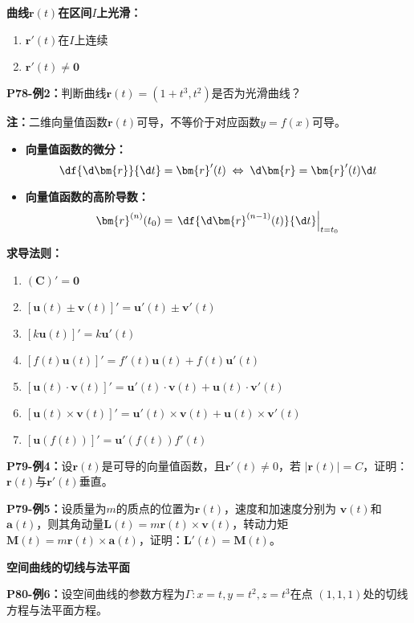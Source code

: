 {\bf 曲线$\bm{r}(t)$在区间$I$上光滑：}
\begin{enumerate}[(1)]
  \setlength{\itemindent}{1cm}
  \item $\bm{r}'(t)$在$I$上连续
  \item $\bm{r}'(t)\ne \bm{0}$
\end{enumerate}

{\bf P78-例2：}判断曲线$\bm{r}(t)=(1+t^3,t^2)$是否为光滑曲线？

{\bf 注：}二维向量值函数$\bm{r}(t)$可导，不等价于对应函数$y=f(x)$可导。

\begin{itemize}
  \setlength{\itemindent}{1cm}
  \item {\bf 向量值函数的微分：}
  $$\df{\d\bm{r}}{\d t}=\bm{r}'(t)\;\Leftrightarrow\;
  \d\bm{r}=\bm{r}'(t)\d t$$
  \item {\bf 向量值函数的高阶导数：}
  $$\bm{r}^{(n)}(t_0)=\left.\df{\d\bm{r}^{(n-1)}(t)}{\d t}\right|_{t=t_0}$$
\end{itemize}

{\bf 求导法则：}

\begin{enumerate} 
  \item $(\bm{C})'=\bm{0}$ 
  \item $[\bm{u}(t)\pm\bm{v}(t)]'=\bm{u}'(t)\pm\bm{v}'(t)$ 
  \item $[k\bm{u}(t)]'=k\bm{u}'(t)$ 
  \item $[f(t)\bm{u}(t)]'=f'(t)\bm{u}(t)+f(t)\bm{u}'(t)$ 
  \item {$[\bm{u}(t)\cdot\bm{v}(t)]'=\bm{u}'(t)\cdot\bm{v}(t)
  +\bm{u}(t)\cdot\bm{v}'(t)$} 
  \item {$[\bm{u}(t)\times\bm{v}(t)]'=\bm{u}'(t)\times\bm{v}(t)
  +\bm{u}(t)\times\bm{v}'(t)$} 
  \item $[\bm{u}(f(t))]'=\bm{u}'(f(t))f'(t)$ 
\end{enumerate}

{\bf P79-例4：}设$\bm{r}(t)$是可导的向量值函数，且$\bm{r}'(t)\ne 0$，若
$|\bm{r}(t)|=C$，证明：$\bm{r}(t)$与$\bm{r}'(t)$垂直。

{\bf P79-例5：}设质量为$m$的质点的位置为$\bm{r}(t)$，速度和加速度分别为
$\bm{v}(t)$和$\bm{a}(t)$，则其角动量$\bm{L}(t)
=m\bm{r}(t)\times\bm{v}(t)$，转动力矩$\bm{M}(t)=m\bm{r}(t)
\times\bm{a}(t)$，证明：$\bm{L}'(t)=\bm{M}(t)$。

{\bf 空间曲线的切线与法平面}

{\bf P80-例6：}设空间曲线的参数方程为$\Gamma:x=t,y=t^2,z=t^3$在点
$(1,1,1)$处的切线方程与法平面方程。

